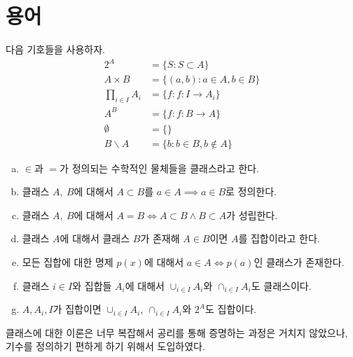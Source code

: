 \section{용어}
\begin{definition}
	다음 기호들을 사용하자.
	\begin{align}
		2^A &= \{S : S \subset A\} \\
		A \times B &= \{(a, b) : a \in A, b \in B\} \\
		\prod_{i \in I} A_i &= \{f : f : I \to A_i\} \\
		A^B &= \{f : f : B \to A\} \\
		\emptyset &= \{\} \\
		B \backslash A &= \{b : b \in B, b \not\in A\}
	\end{align}
\end{definition}
\begin{definition}
	\begin{enumerate}[(a)]
		\item $\in$과 $=$가 정의되는 수학적인 물체들을 클래스라고 한다.
		\item 클래스 $A,\:B$에 대해서 $A \subset B$를 $a \in A \implies a \in B$로 정의한다.
		\item 클래스 $A,\:B$에 대해서 $A = B \iff A \subset B \land B \subset A$가 성립한다.
		\item 클래스 $A$에 대해서 클래스 $B$가 존재해 $A \in B$이면 $A$를 집합이라고 한다.
		\item 모든 집합에 대한 명제 $p(x)$에 대해서 $a \in A \iff p(a)$인 클래스가 존재한다.
		\item 클래스 $i \in I$와 집합들 $A_i$에 대해서 $\cup_{i \in I} A_i$와 $\cap_{i \in I} A_i$도 클래스이다. 
		\item $A, A_i, I$가 집합이면 $\cup_{i \in I} A_i,\:\cap_{i \in I} A_i$와 $2^A$도 집합이다.
	\end{enumerate}
\end{definition}
\begin{remark}
	클래스에 대한 이론은 너무 복잡해서 공리를 통해 증명하는 과정은 거치지 않았으나, 기수를 정의하기 편하게 하기 위해서 도입하였다.
\end{remark}


